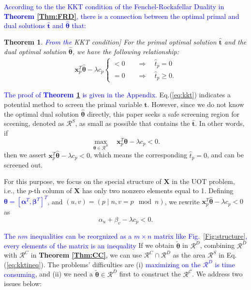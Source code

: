 \documentclass[twoside]{article}
\theoremstyle{plain}
\newtheorem{thm}{Theorem}
\newcommand{\mat}[1]{\mathbf{#1}}
\renewcommand{\vec}[1]{\bm{#1}}
\newcommand{\changeXS}[1]{\textcolor{blue}{#1}}
\begin{document}
\changeXS{According to the the KKT condition of the Fenchel-Rockafellar Duality in {\bf Theorem \ref{Thm:FRD}}, there is a connection between the optimal primal and dual solutions $ \hat{\vec{t}}$ and $\hat{\vec{\theta}}$ that:}
\begin{thm}\changeXS{From the }KKT condition] For the primal optimal solution $\hat{\vec{t}}$ and the dual optimal solution $\hat{\vec{\theta}}$, we have the following relationship:
\label{Thm:KKT}
 \begin{equation}
\begin{split}
\vec{x}_p^T\hat{\vec{\theta}} -\lambda c_p \left\{
\begin{aligned}
< 0 \quad& \Longrightarrow \quad\hat{t}_p = 0\\
= 0 \quad& \Longrightarrow \quad\hat{t}_p \geq 0.
\end{aligned}
\right.
 \end{split}
 \label{eq:kkt}
\end{equation}
\end{thm}
\changeXS{The proof of {\bf Theorem \ref{Thm:KKT}} is given in the Appendix.} Eq.(\ref{eq:kkt}) indicates a potential method to screen the primal variable $\vec{t}$. However, since we do not know the optimal dual solution $\hat{\vec{\theta}}$ directly, this paper seeks a safe screening region for sceening, denoted as $\mathcal{R}^{S}$, as small as possible that contains the $\hat{\vec{t}}$. In other words, if
\begin{equation}
\label{eq:kktineq}
\max_{\vec{\theta} \in \mathcal{R}^S}\quad  \vec{x}_p^T\vec{\theta} -\lambda c_p < 0.
\end{equation}
then we assert 
$\vec{x}_p^T\hat{\vec{\theta}} -\lambda c_p < 0$,
which means the corresponding $\hat{{t}}_p = 0$, and can be screened out. 

For this purpose, we focus on the special structure of $\mat{X}$ in the UOT problem, i.e., the $p$-th column of $\mat{X}$ has only two nonzero elements equal to 1. Defining  \changeXS{$\vec{\theta} = [{\vec{\alpha}}^T,{\vec{\beta}}^T]^T$}, and $(u,v)=(p \mid n,v= p \mod n)$, we rewrite $\vec{x}_p^T\hat{\vec{\theta}} -\lambda c_p < 0$ as
%
\begin{equation}
\alpha_{u} + \beta_{v}-\lambda c_p < 0.
\end{equation}

\changeXS{The $nm$ inequalities can be reorgnized as a  $m \times n$ matrix like Fig.~\ref{Fig:structure}, every elements of the matrix is an inequality} If we obtain $\tilde{\vec{\theta}}$ in $\mathcal{R}^{D}$, combining $\mathcal{R}^{D}$ with $\mathcal{R}^{C}$ in {\bf Theorem \ref{Thm:CC}}, we can use $\mathcal{R}^{C}\cap\mathcal{R}^{D}$ as the area $\mathcal{R}^{S}$ in Eq.(\ref{eq:kktineq}). The problems' difficulties are (i) \changeXS{maximizing on the $\mathcal{R}^{D}$ is time consuming}, and (ii) we need a $\tilde{\vec{\theta}} \in \mathcal{R}^{D}$ first to construct the $\mathcal{R^{C}}$. We address two issues below:
\end{document}
